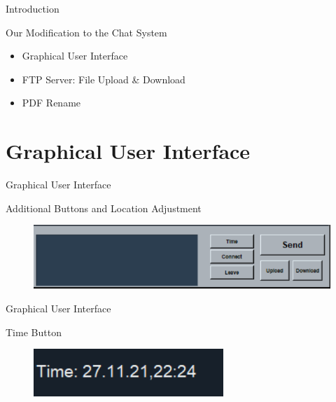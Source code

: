 \documentclass[a4paper,10pt]{beamer}
\begin{document}
\begin{frame}{Introduction}
\begin{block}{Our Modification to the Chat System}
\begin{itemize}
		\item Graphical User Interface
		\item FTP Server: File Upload \& Download
		\item PDF Rename
\end{itemize}
\end{block}
\end{frame}


\section{Graphical User Interface}

\begin{frame}{Graphical User Interface}
\begin{block}{Additional Buttons and Location Adjustment}
\begin{figure}
    \centering
    \includegraphics[width=0.85\linewidth]{button place.png}
\end{figure}
\end{block}
\end{frame}

\begin{frame}{Graphical User Interface}

\begin{block}{Time Button}
\begin{figure}
    \centering
    \includegraphics[width=0.3\linewidth]{time.png}
\end{figure}
	\inputminted[linenos]{python}{time.py}
\end{block}
\end{frame}
\end{document}
